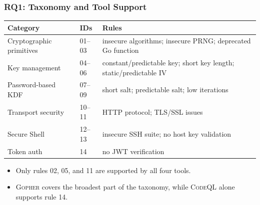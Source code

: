 \documentclass[10pt]{beamer}
\newcommand{\CodeQL}{\textsc{CodeQL}\xspace}
\newcommand{\Gopher}{\textsc{Gopher}\xspace}
\begin{document}
\begin{frame}
    \frametitle{RQ1: Taxonomy and Tool Support}
    \small
    \begin{table}
        \centering
        \renewcommand{\arraystretch}{1.15}
        \begin{tabular}{p{2.8cm}p{0.9cm}p{5.8cm}}
            \textbf{Category} & \textbf{IDs} & \textbf{Rules} \\
            \hline
            Cryptographic primitives & 01--03 & insecure algorithms; insecure PRNG; deprecated Go function \\
            Key management & 04--06 & constant/predictable key; short key length; static/predictable IV \\
            Password-based KDF & 07--09 & short salt; predictable salt; low iterations \\
            Transport security & 10--11 & HTTP protocol; TLS/SSL issues \\
            Secure Shell & 12--13 & insecure SSH suite; no host key validation \\
            Token auth & 14 & no JWT verification \\
        \end{tabular}
    \end{table}
    \normalsize
\vspace{0.15em}
\begin{itemize}
    \setlength{\itemsep}{0.35em}
    \item Only rules 02, 05, and 11 are supported by all four tools.
    \item \Gopher covers the broadest part of the taxonomy, while \CodeQL alone supports rule 14.
\end{itemize}
\end{frame}
\end{document}
